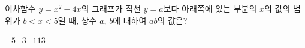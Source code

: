 \hspace*{2mm}\begin{minipage}[t]{\dimexpr\linewidth-2mm\relax}\vspace{0pt}
이차함수 $y=x^2-4x$의 그래프가 직선 $y=a$보다 아래쪽에 있는 부분의 $x$의 값의 범위가 $b<x<5$일 때, 상수 $a$, $b$에 대하여 $ab$의 값은?
\begin{choices32}{$-5$}{$-3$}{$-1$}{$1$}{$3$}\end{choices32}\end{minipage}
